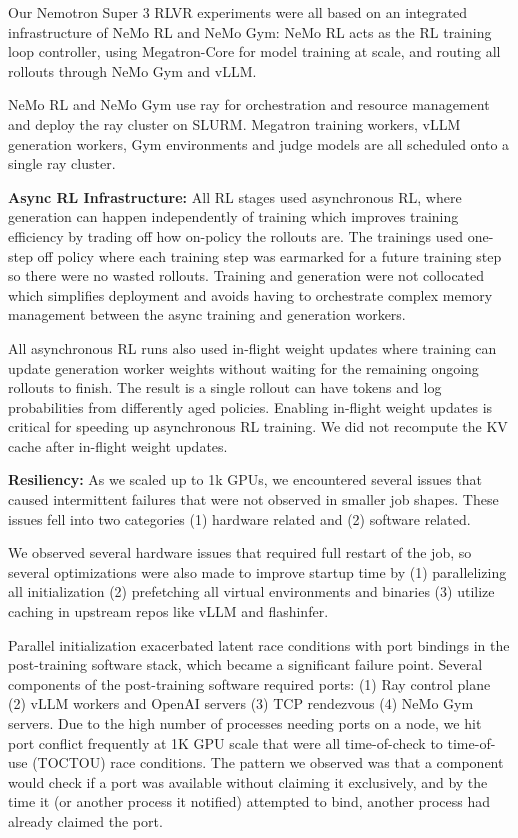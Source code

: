 Our Nemotron Super 3 RLVR experiments were all based on an integrated infrastructure of NeMo RL and NeMo Gym: NeMo RL acts as the RL training loop controller, using Megatron-Core \citep{shoeybi2020megatronlmtrainingmultibillionparameter} for model training at scale, and routing all rollouts through NeMo Gym and vLLM.

NeMo RL and NeMo Gym use ray for orchestration and resource management and deploy the ray cluster on SLURM. Megatron training workers, vLLM generation workers, Gym environments and judge models are all scheduled onto a single ray cluster.

\textbf{Async RL Infrastructure: } 
All RL stages used asynchronous RL, where generation can happen independently of training which improves training efficiency by trading off how on-policy the rollouts are. The trainings used one-step off policy where each training step was earmarked for a future training step so there were no wasted rollouts. Training and generation were not collocated which simplifies deployment and avoids having to orchestrate complex memory management between the async training and generation workers.

All asynchronous RL runs also used in-flight weight updates \citep{piche2025pipelinerl} where training can update generation worker weights without waiting for the remaining ongoing rollouts to finish. The result is a single rollout can have tokens and log probabilities from differently aged policies. Enabling in-flight weight updates is critical for speeding up asynchronous RL training. We did not recompute the KV cache after in-flight weight updates.

\textbf{Resiliency: }
As we scaled up to 1k GPUs, we encountered several issues that caused intermittent failures that were not observed in smaller job shapes. These issues fell into two categories (1) hardware related and (2) software related.

We observed several hardware issues that required full restart of the job, so several optimizations were also made to improve startup time by (1) parallelizing all initialization (2) prefetching all virtual environments and binaries (3) utilize caching in upstream repos like vLLM and flashinfer.

Parallel initialization exacerbated latent race conditions with port bindings in the post-training software stack, which became a significant failure point. Several components of the post-training software required ports: (1) Ray control plane (2) vLLM workers and OpenAI servers (3) TCP rendezvous (4) NeMo Gym servers. Due to the high number of processes needing ports on a node, we hit port conflict frequently at 1K GPU scale that were all time-of-check to time-of-use (TOCTOU) race conditions. The pattern we observed was that a component would check if a port was available without claiming it exclusively, and by the time it (or another process it notified) attempted to bind, another process had already claimed the port.


